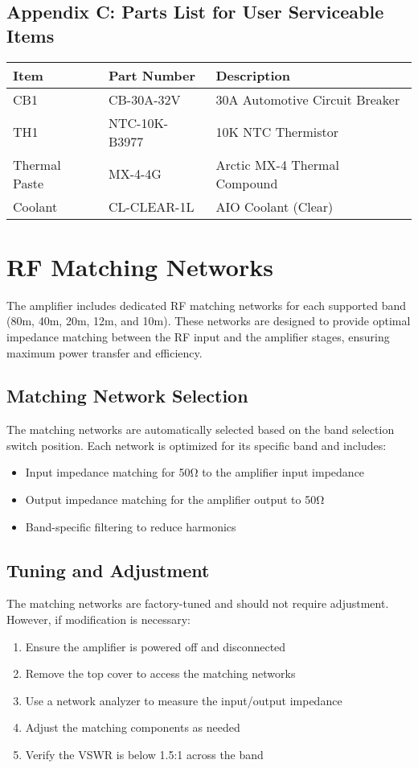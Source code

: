 \documentclass[11pt,a4paper]{article}
\begin{document}
\subsection{Appendix C: Parts List for User Serviceable Items}
\begin{center}
\begin{tabular}{|l|l|l|}
\hline
\textbf{Item} & \textbf{Part Number} & \textbf{Description} \\
\hline
CB1 & CB-30A-32V & 30A Automotive Circuit Breaker \\
TH1 & NTC-10K-B3977 & 10K NTC Thermistor \\
Thermal Paste & MX-4-4G & Arctic MX-4 Thermal Compound \\
Coolant & CL-CLEAR-1L & AIO Coolant (Clear) \\
\hline
\end{tabular}
\end{center}

\section{RF Matching Networks}
\label{sec:rf_matching}

The amplifier includes dedicated RF matching networks for each supported band (80m, 40m, 20m, 12m, and 10m). These networks are designed to provide optimal impedance matching between the RF input and the amplifier stages, ensuring maximum power transfer and efficiency.

\subsection{Matching Network Selection}
The matching networks are automatically selected based on the band selection switch position. Each network is optimized for its specific band and includes:
\begin{itemize}
    \item Input impedance matching for 50Ω to the amplifier input impedance
    \item Output impedance matching for the amplifier output to 50Ω
    \item Band-specific filtering to reduce harmonics
\end{itemize}

\subsection{Tuning and Adjustment}
The matching networks are factory-tuned and should not require adjustment. However, if modification is necessary:
\begin{enumerate}
    \item Ensure the amplifier is powered off and disconnected
    \item Remove the top cover to access the matching networks
    \item Use a network analyzer to measure the input/output impedance
    \item Adjust the matching components as needed
    \item Verify the VSWR is below 1.5:1 across the band
\end{enumerate}
\end{document}

